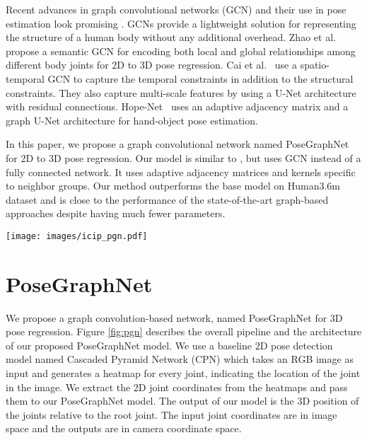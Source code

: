 \documentclass{article}
\begin{document}
Recent advances in graph convolutional networks (GCN) and their use in pose estimation look promising \cite{Cai2019,Zhao2019,Doosti2020}.
GCNs provide a lightweight solution for representing the structure of a human body without any additional overhead.
Zhao et al.~\cite{Zhao2019} propose a semantic GCN for encoding both local and global relationships among different body joints for 2D to 3D pose regression.
Cai et al.~\cite{Cai2019} use a spatio-temporal GCN to capture the temporal constraints in addition to the structural constraints. They also capture multi-scale features by using a U-Net architecture with residual connections.
Hope-Net~\cite{Doosti2020} uses an adaptive adjacency matrix and a graph U-Net architecture for hand-object pose estimation.

In this paper, we propose a graph convolutional network named PoseGraphNet for 2D to 3D pose regression.
Our model is similar to \cite{Martinez2017}, but uses GCN instead of a fully connected network.
It uses adaptive adjacency matrices and kernels specific to neighbor groups.
Our method outperforms the base model \cite{Martinez2017} on  Human3.6m dataset \cite{ionescu2013human3} and is close to the performance of the state-of-the-art graph-based approaches \cite{Cai2019} despite having much fewer parameters.


\begin{figure*}
\begin{center}
\texttt{[image: images/icip\_pgn.pdf]}
\end{center}
   \caption{Overview of the 3D pose regression algorithm. The proposed PoseGraphNet is highlighted by the blue rectangle.}
\label{fig:pgn}
\end{figure*}

\section{PoseGraphNet}

We propose a graph convolution-based network, named PoseGraphNet for 3D pose regression. 
Figure \ref{fig:pgn} describes the overall pipeline and the architecture of our proposed PoseGraphNet model.
We use a baseline 2D pose detection model named Cascaded Pyramid Network (CPN) \cite{Chen2018} which takes an RGB image as input and generates a heatmap for every joint, indicating the location of the joint in the image.
We extract the 2D joint coordinates from the heatmaps and pass them to our PoseGraphNet model.
The output of our model is the 3D position of the joints relative to the root joint.
The input joint coordinates are in image space and the outputs are in camera coordinate space. 
\end{document}
